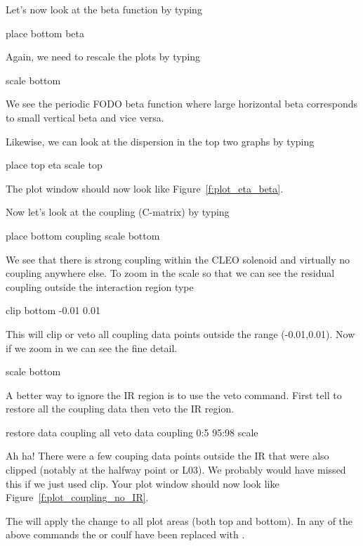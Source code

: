 Let's now look at the beta function by typing
\begin{example}
  place bottom beta
\end{example}
Again, we need to rescale the plots by typing
\begin{example}
  scale bottom
\end{example}
We see the periodic FODO beta function where large horizontal beta corresponds to
small vertical beta and vice versa.

Likewise, we can look at the dispersion in the top two graphs by typing
\begin{example}
  place top eta
  scale top
\end{example}
The plot window should now look like Figure~\ref{f:plot_eta_beta}.

Now let's look at the coupling (C-matrix) by typing
\begin{example}
  place bottom coupling
  scale bottom
\end{example}
We see that there is strong coupling within the CLEO solenoid and virtually no
coupling anywhere else. To zoom in the scale so that we can see the residual
coupling outside the interaction region type
\begin{example}
  clip bottom -0.01 0.01
\end{example}
This will clip or veto all coupling data points outside the range (-0.01,0.01).
Now if we zoom in we can see the fine detail.
\begin{example}
  scale bottom
\end{example}
A better way to ignore the IR region is to use the veto command. First tell \tao
to restore all the coupling data then veto the IR region.
\begin{example}
  restore data coupling all
  veto data coupling 0:5 95:98
  scale
\end{example}
Ah ha! There were a few couping data points outside the IR  that were also
clipped (notably at the halfway point or L03). We probably would have missed
this if we just used clip. Your plot window should now look like
Figure~\ref{f:plot_coupling_no_IR}.



The  will apply the change to all plot areas (both top and bottom). In
any of the above commands the  or  coulf have been replaced
with .

